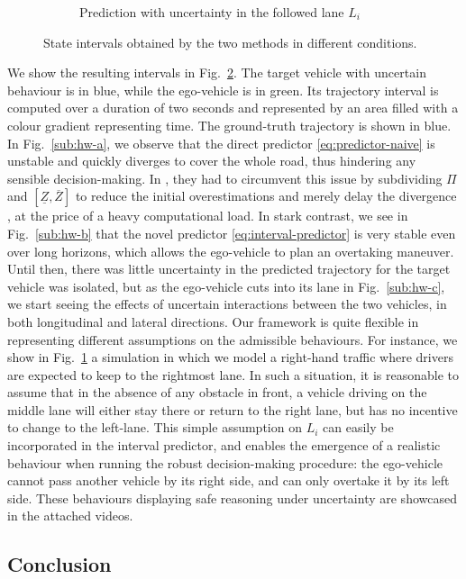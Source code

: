 \begin{figure}
\begin{center}
\begin{subfigure}[b]{0.75\linewidth}
		\caption{Prediction with uncertainty in the followed lane $L_i$}
		\label{sub:hw-d}
	\end{subfigure}
	\end{center}
	\caption{State intervals obtained by the two methods in different conditions.}
	\label{fig:highway}
\end{figure}


We show the resulting intervals in Fig.~\ref{fig:highway}. The target vehicle with uncertain behaviour is in blue, while the ego-vehicle is in green. Its trajectory interval is computed over a duration of two seconds and represented by an area filled with a colour gradient representing time. The ground-truth trajectory is shown in blue. In Fig.~\ref{sub:hw-a}, we observe that the direct predictor \eqref{eq:predictor-naive} is unstable and quickly diverges to cover the whole road, thus hindering any sensible decision-making. In \citep{Leurent2018}, they had to circumvent this issue by subdividing $\Pi$ and $[\underline{Z}, \overline{Z}]$ to reduce the initial overestimations and merely delay the divergence \citep{Adrot2003}, at the price of a heavy computational load. In stark contrast, we see in Fig.~\ref{sub:hw-b} that the novel predictor \eqref{eq:interval-predictor} is very stable even over long horizons, which allows the ego-vehicle to plan an overtaking maneuver. Until then, there was little uncertainty in the predicted trajectory for the target vehicle was isolated, but as the ego-vehicle cuts into its lane in Fig.~\ref{sub:hw-c}, we start seeing the  effects of uncertain interactions between the two vehicles, in both longitudinal and lateral directions. Our framework is quite flexible in representing different assumptions on the admissible behaviours. For instance, we show in Fig.~\ref{sub:hw-d} a simulation in which we model a right-hand traffic where drivers are expected to keep to the rightmost lane. In such a situation, it is reasonable to assume that in the absence of any obstacle in front, a vehicle driving on the middle lane will either stay there or return to the right lane, but has no incentive to change to the left-lane. This simple assumption on $L_i$ can easily be incorporated in the interval predictor, and enables the emergence of a realistic behaviour when running the robust decision-making procedure: the ego-vehicle cannot pass another vehicle by its right side, and can only overtake it by its left side. These behaviours displaying safe reasoning under uncertainty are showcased in the attached videos.

\subsection*{Conclusion}

